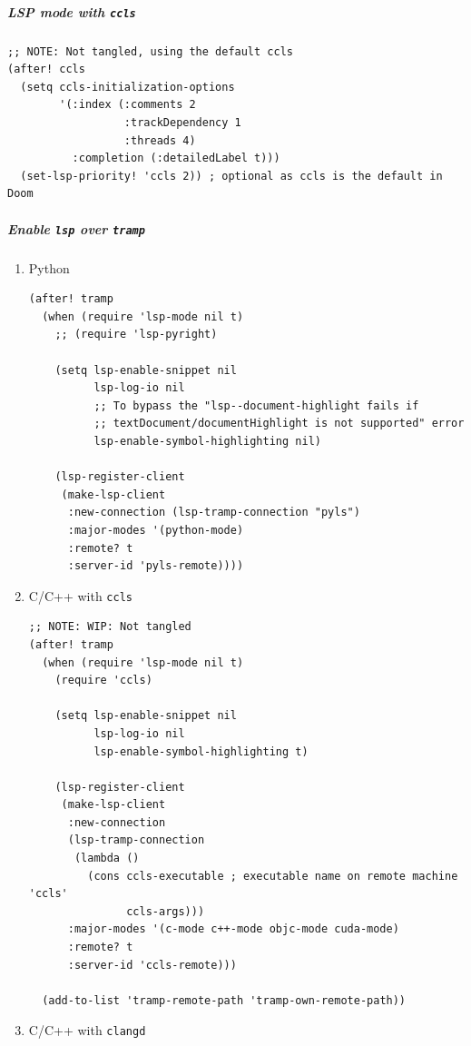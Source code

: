 \documentclass[11pt]{article}
\begin{document}
\subparagraph{LSP mode with \texttt{ccls}}
\label{sec:org4fb9731}

\begin{verbatim}
;; NOTE: Not tangled, using the default ccls
(after! ccls
  (setq ccls-initialization-options
        '(:index (:comments 2
                  :trackDependency 1
                  :threads 4)
          :completion (:detailedLabel t)))
  (set-lsp-priority! 'ccls 2)) ; optional as ccls is the default in Doom
\end{verbatim}

\subparagraph{Enable \texttt{lsp} over \texttt{tramp}}
\label{sec:org9eef70f}
\begin{enumerate}
\item Python
\label{sec:orgb8cf52e}

\begin{verbatim}
(after! tramp
  (when (require 'lsp-mode nil t)
    ;; (require 'lsp-pyright)

    (setq lsp-enable-snippet nil
          lsp-log-io nil
          ;; To bypass the "lsp--document-highlight fails if
          ;; textDocument/documentHighlight is not supported" error
          lsp-enable-symbol-highlighting nil)

    (lsp-register-client
     (make-lsp-client
      :new-connection (lsp-tramp-connection "pyls")
      :major-modes '(python-mode)
      :remote? t
      :server-id 'pyls-remote))))
\end{verbatim}

\item C/C++ with \texttt{ccls}
\label{sec:org3ce30dc}

\begin{verbatim}
;; NOTE: WIP: Not tangled
(after! tramp
  (when (require 'lsp-mode nil t)
    (require 'ccls)

    (setq lsp-enable-snippet nil
          lsp-log-io nil
          lsp-enable-symbol-highlighting t)

    (lsp-register-client
     (make-lsp-client
      :new-connection
      (lsp-tramp-connection
       (lambda ()
         (cons ccls-executable ; executable name on remote machine 'ccls'
               ccls-args)))
      :major-modes '(c-mode c++-mode objc-mode cuda-mode)
      :remote? t
      :server-id 'ccls-remote)))

  (add-to-list 'tramp-remote-path 'tramp-own-remote-path))
\end{verbatim}

\item C/C++ with \texttt{clangd}
\label{sec:orgd016747}


\end{enumerate}
\end{document}
